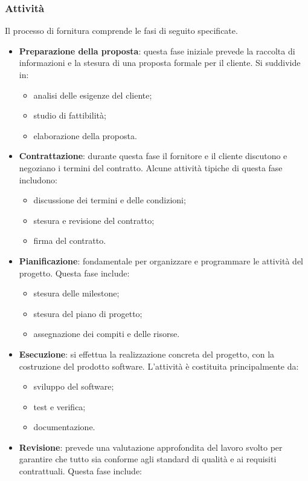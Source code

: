 \subsubsection{Attività}
Il processo di fornitura comprende le fasi di seguito specificate.
\begin{itemize}
	\item \textbf{Preparazione della proposta}: questa fase iniziale prevede la raccolta di informazioni e la stesura di una proposta formale per il cliente. Si suddivide in:
	      \begin{itemize}
		      \item analisi delle esigenze del cliente;
		      \item studio di fattibilità;
		      \item elaborazione della proposta.
	      \end{itemize}
	\item \textbf{Contrattazione}: durante questa fase il fornitore e il cliente discutono e negoziano i termini del contratto. Alcune attività tipiche di questa fase includono:
	      \begin{itemize}
		      \item discussione dei termini e delle condizioni;
		      \item stesura e revisione del contratto;
		      \item firma del contratto.
	      \end{itemize}
	\item \textbf{Pianificazione}: fondamentale per organizzare e programmare le attività del progetto. Questa fase include:
	      \begin{itemize}
		      \item stesura delle milestone;
		      \item stesura del piano di progetto;
		      \item assegnazione dei compiti e delle risorse.
	      \end{itemize}
	\item \textbf{Esecuzione}: si effettua la realizzazione concreta del progetto, con la costruzione del prodotto software. L'attività è costituita principalmente da:
	      \begin{itemize}
		      \item sviluppo del software;
		      \item test e verifica;
		      \item documentazione.
	      \end{itemize}
	\item \textbf{Revisione}: prevede una valutazione approfondita del lavoro svolto per garantire che tutto sia conforme agli standard di qualità e ai requisiti contrattuali. Questa fase include:

\end{itemize}
